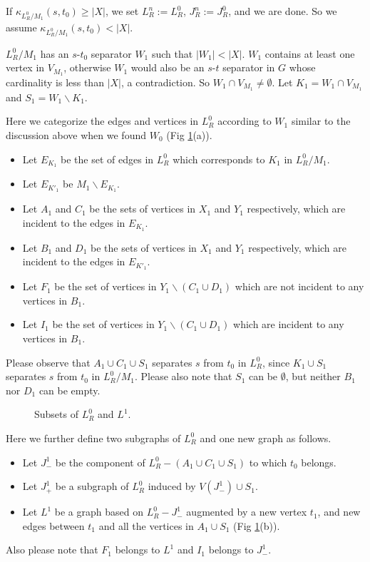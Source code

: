 \documentclass{article}
\begin{document}
If $\kappa_{L_R^0/M_1}(s, t_0) \ge |X|$, we set $L_R^n := L_R^0$, $J_R^n := J_R^0$, and we are done.
So we assume $\kappa_{L_R^0/M_1}(s, t_0) < |X|$.

$L_R^0/{M_1}$ has an $s$-$t_0$ separator $W_1$ such that
$|W_1| < |X|$. $W_1$ contains at least one vertex in $V_{M_1}$, otherwise $W_1$ would also be an $s$-$t$ separator
in $G$ whose cardinality is less than $|X|$, a contradiction.
So $W_1\cap V_{M_1}\ne \emptyset$. Let $K_1 = W_1\cap V_{M_1}$ and $S_1 = W_1 \backslash K_1$.

Here we categorize the edges and vertices in $L_R^0$ according to $W_1$
similar to the discussion above when we found $W_0$ (Fig \ref{label_fig9}(a)).
\begin{itemize}
\item Let $E_{K_1}$ be the set of edges in $L_R^0$ which corresponds to $K_1$ in $L_R^0/M_1$.
\item Let $E_{K'_1}$ be $M_1\backslash E_{K_1}$.
\item Let $A_1$ and $C_1$ be the sets of vertices in $X_1$ and $Y_1$ respectively,
which are incident to the edges in $E_{K_1}$.
\item Let $B_1$ and $D_1$ be the sets of vertices in $X_1$ and $Y_1$ respectively,
which are incident to the edges in $E_{K'_1}$.
\item Let $F_1$ be the set of vertices in $Y_1\backslash (C_1\cup D_1)$ which are not incident to any vertices in $B_1$.
\item Let $I_1$ be the set of vertices in $Y_1\backslash (C_1\cup D_1)$ which are incident to any vertices in $B_1$.
\end{itemize}
Please observe that $A_1 \cup C_1 \cup S_1$ separates $s$ from $t_0$ in $L_R^0$,
since $K_1 \cup S_1$ separates $s$ from $t_0$ in $L_R^0/M_1$.
Please also note that $S_1$ can be $\emptyset$, but neither $B_1$ nor $D_1$ can be empty.

\begin{figure}\begin{center}
\caption[Fig9]{Subsets of $L_R^0$ and $L^1$.}
\label{label_fig9}
\end{center}\end{figure}

Here we further define two subgraphs of $L_R^0$ and one new graph as follows.
\begin{itemize}
\item Let $J_-^1$ be the component of $L_R^0 - (A_1 \cup C_1 \cup S_1)$ to which $t_0$ belongs.
\item Let $J_+^1$ be a subgraph of $L_R^0$ induced by $V(J_-^1)\cup S_1$.
\item Let $L^1$ be a graph based on $L_R^0 - J_-^1$ augmented by a new vertex $t_1$,
and new edges between $t_1$ and all the vertices in $A_1 \cup S_1$ (Fig \ref{label_fig9}(b)).
\end{itemize}
Also please note that $F_1$ belongs to $L^1$ and $I_1$ belongs to $J_-^1$.
\end{document}

